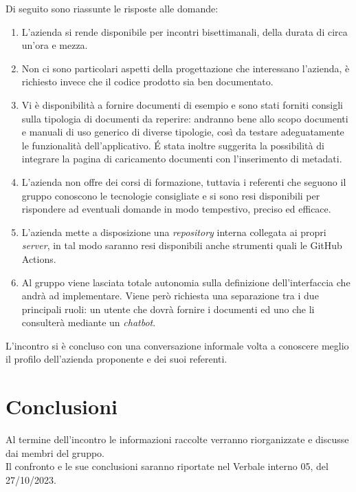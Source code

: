 \noindent
Di seguito sono riassunte le risposte alle domande:
\begin{enumerate}
	\item L'azienda si rende disponibile per incontri bisettimanali, della durata di circa un'ora e mezza.
	\item Non ci sono particolari aspetti della progettazione che interessano l'azienda, è richiesto invece che il codice prodotto sia ben documentato.
	\item Vi è disponibilità a fornire documenti di esempio e sono stati forniti consigli sulla tipologia di documenti da reperire: andranno bene allo scopo documenti e manuali di uso generico di diverse tipologie, così da testare adeguatamente le funzionalità dell'applicativo. \'E stata inoltre suggerita la possibilità di integrare la pagina di caricamento documenti con l'inserimento di metadati.
	\item L'azienda non offre dei corsi di formazione, tuttavia i referenti che seguono il gruppo conoscono le tecnologie consigliate e si sono resi disponibili per rispondere ad eventuali domande in modo tempestivo, preciso ed	efficace.
	\item L'azienda mette a disposizione una \textit{repository} interna collegata ai propri \textit{server}, in tal modo saranno resi disponibili anche strumenti quali le GitHub Actions.
	\item Al gruppo viene lasciata totale autonomia sulla definizione dell'interfaccia che andrà ad implementare. Viene però richiesta una separazione tra i due principali ruoli: un utente che dovrà fornire i documenti ed uno che li consulterà mediante un \textit{chatbot}.
\end{enumerate}

\noindent
L'incontro si è concluso con una conversazione informale volta a conoscere meglio il profilo dell'azienda proponente e dei suoi referenti.


\section{Conclusioni}
Al termine dell'incontro le informazioni raccolte verranno riorganizzate e discusse dai membri del gruppo. \\
Il confronto e le sue conclusioni saranno riportate nel Verbale interno 05, del 27/10/2023.

